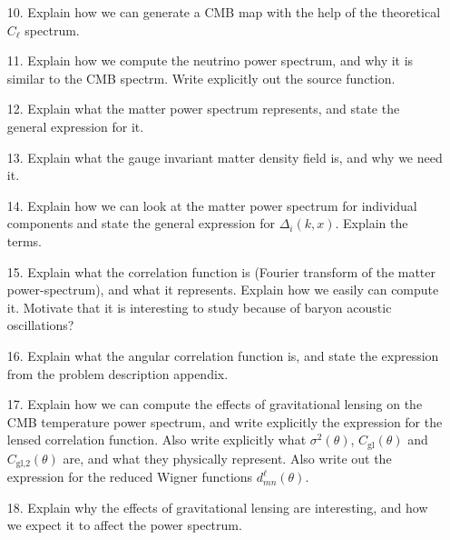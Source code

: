 \documentclass{aa}
\begin{document}
\begin{enumerate}
  \item [10.] Explain how we can generate a CMB map with the help of the theoretical $C_\ell$ spectrum.
  \item [11.] Explain how we compute the neutrino power spectrum, and why it is similar to the CMB spectrm. Write explicitly out the source function.
  \item [12.] Explain what the matter power spectrum represents, and state the general expression for it. 
  \item [13.] Explain what the gauge invariant matter density field is, and why we need it.
  \item [14.] Explain how we can look at the matter power spectrum for individual components and state the general expression for $\Delta_i(k,x)$. Explain the terms.
  \item [15.] Explain what the correlation function is (Fourier transform of the matter power-spectrum), and what it represents. Explain how we easily can compute it. Motivate that it is interesting to study because of baryon acoustic oscillations?
  \item [16.] Explain what the angular correlation function is, and state the expression from the problem description appendix.
  \item [17.] Explain how we can compute the effects of gravitational lensing on the CMB temperature power spectrum, and write explicitly the expression for the lensed correlation function. Also write explicitly what $\sigma^2(\theta)$, $C_\text{gl}(\theta)$ and $C_\text{gl,2}(\theta)$ are, and what they physically represent. Also write out the expression for the reduced Wigner functions $d_{mn}^\ell(\theta)$. 
  \item [18.] Explain why the effects of gravitational lensing are interesting, and how we expect it to affect the power spectrum.
\end{enumerate}
\end{document}
